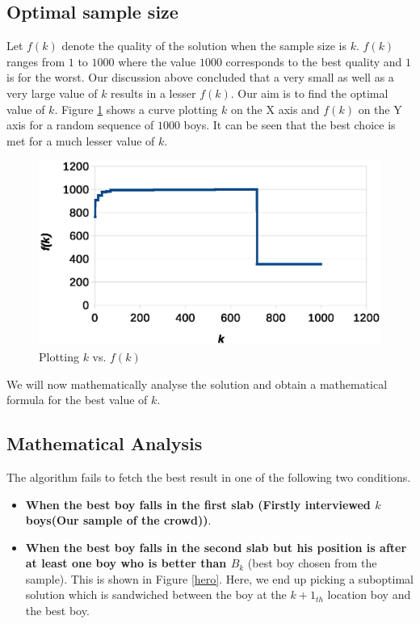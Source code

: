 \documentclass{book}
\begin{document}
\subsection{Optimal sample size}
Let $f(k)$ denote the quality of the solution when the sample size is $k$. $f(k)$ ranges from $1$ to $1000$ where the value $1000$ corresponds to the best quality and $1$ is for the worst. Our discussion above concluded that a very small as well as a very large value of $k$ results in a lesser $f(k)$. Our aim is to find the optimal value of $k$. Figure \ref{dating_k} shows a curve plotting $k$ on the X axis and $f(k)$ on the Y axis for a random sequence of $1000$ boys. It can be seen that the best choice is met for a much lesser value of $k$. 
\begin{figure}[h!]
\centering
\includegraphics[scale=0.8]{dating.eps}
\caption{Plotting $k$ vs. $f(k)$}
\label{dating_k}
\end{figure} 
We will now mathematically analyse the solution and obtain a mathematical formula for the best value of $k$.

\subsection{Mathematical Analysis}

The algorithm fails to fetch the best result in one of the following two conditions.
\begin{itemize}
\item \textbf{When the best boy falls in the first slab (Firstly interviewed $k$ boys(Our sample of the crowd))}. 
\item \textbf{When the best boy falls in the second slab but his position is after at least one boy who is better than $B_k$} (best boy chosen from the sample). This is shown in Figure \ref{hero}. Here, we end up picking a suboptimal solution which is sandwiched between the boy at the $k+1_{th}$ location boy and the best boy. 
\end{itemize}
\end{document}

